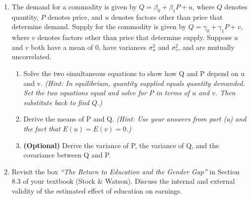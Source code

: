 \documentclass[11pt]{article}
\begin{document}
\begin{enumerate}
\begin{enumerate}
\def\labelenumi{\alph{enumi}.}

\item
  Draw a DAG that includes the following variables: Earnings, Number of Children, Decision to Work Outside the Home, and Ability/Motivation. Add arrows representing plausible causal relationships. For each arrow, write one sentence explaining why you included it.
\item
  Is ``Decision to Work Outside the Home'' a confounder, a collider, or a mediator on the path between Number of Children and Earnings? Explain.
\item
  When researchers study only employed women, they are conditioning on ``Decision to Work.'' Using your DAG, explain why this could produce a spurious positive relationship between number of children and earnings --- even if children have no direct causal effect on earnings.
\end{enumerate}


\item
  The demand for a commodity is given by
  \(Q = \beta_0 + \beta_1 P + u\), where \(Q\) denotes quantity, \(P\)
  denotes price, and \(u\) denotes factors other than price that
  determine demand. Supply for the commodity is given by
  \(Q = \gamma_0 + \gamma_1P + v\), where \(v\) denotes factors other
  than price that determine supply. Suppose \(u\) and \(v\) both have a
  mean of 0, have variances \(\sigma^2_u\) and \(\sigma^2_v\), and are
  mutually uncorrelated.

\begin{enumerate}
\def\labelenumi{\alph{enumi}.}

\item
  Solve the two simultaneous equations to show how Q and P depend on u
  and v. \emph{(Hint: In equilibrium, quantity supplied equals quantity demanded. Set the two equations equal and solve for \(P\) in terms of \(u\) and \(v\). Then substitute back to find \(Q\).)}
\item
  Derive the means of P and Q. \emph{(Hint: Use your answers from part (a) and the fact that \(E(u) = E(v) = 0\).)}
\item
  \textbf{(Optional)} Derive the variance of P, the variance of Q, and the covariance
  between Q and P.
\end{enumerate}


\item
  Revisit the box \emph{``The Return to Education and the Gender Gap''}
  in Section 8.3 of your textbook (Stock \& Watson). Discuss the internal and external validity of the
  estimated effect of education on earnings.


\end{enumerate}
\end{document}
